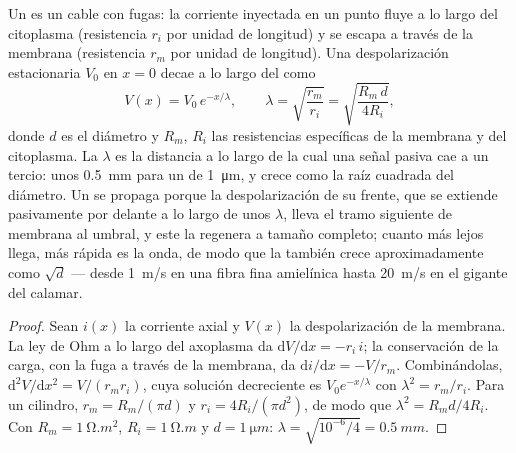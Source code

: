 \begin{theorem}\label{thm:b2:neurons-synapses:cable}
Un  es un cable con fugas: la corriente inyectada en un punto fluye a
lo largo del citoplasma (resistencia $r_i$ por unidad de longitud) y se
escapa a través de la membrana (resistencia $r_m$ por unidad de
longitud). Una despolarización estacionaria $V_0$ en $x = 0$ decae a lo
largo del  como
\[
V(x) = V_0\,e^{-x/\lambda}, \qquad \lambda = \sqrt{\frac{r_m}{r_i}} = \sqrt{\frac{R_m\,d}{4R_i}},
\]
donde $d$ es el diámetro y $R_m$, $R_i$ las resistencias específicas de la
membrana y del citoplasma. La \emph{}
$\lambda$ es la distancia a lo largo de la cual una señal pasiva cae a
un tercio: unos \qty{0.5}{mm} para un  de \qty{1}{\micro m}, y crece
como la raíz cuadrada del diámetro. Un  se propaga
porque la despolarización de su frente, que se extiende pasivamente por
delante a lo largo de unos $\lambda$, lleva el tramo siguiente de membrana
al umbral, y este la regenera a tamaño completo; cuanto más lejos llega,
más rápida es la onda, de modo que la  también
crece aproximadamente como $\sqrt{d}$ --- desde \qty{1}{m/s} en una fibra
fina amielínica hasta \qty{20}{m/s} en el  gigante del calamar.
\end{theorem}
\begin{proof}
Sean $i(x)$ la corriente axial y $V(x)$ la despolarización de la
membrana. La ley de Ohm a lo largo del axoplasma da $\mathrm{d}V/
\mathrm{d}x = -r_i\,i$; la conservación de la carga, con la fuga a través
de la membrana, da $\mathrm{d}i/\mathrm{d}x = -V/r_m$. Combinándolas,
$\mathrm{d}^{2}V/\mathrm{d}x^{2} = V/(r_m r_i)$, cuya solución
decreciente es $V_0 e^{-x/\lambda}$ con $\lambda^{2} = r_m/r_i$. Para un
cilindro, $r_m = R_m/(\pi d)$ y $r_i = 4R_i/(\pi d^{2})$, de modo que
$\lambda^{2} = R_m d/4R_i$. Con $R_m = \qty{1}{\ohm.m^2}$, $R_i =
\qty{1}{\ohm.m}$ y $d = \qty{1}{\micro m}$: $\lambda = \sqrt{10^{-6}
/4} = \qty{0.5}{mm}$.
\end{proof}

